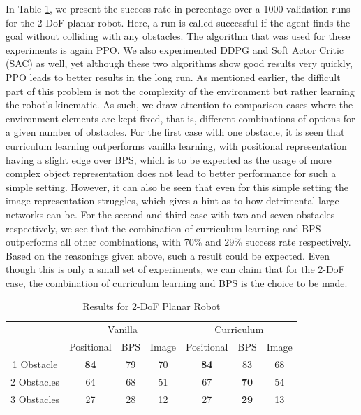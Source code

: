 \documentclass[conference]{IEEEtran}
\begin{document}
In Table \ref{table:1}, we present the success rate in percentage over a 1000 validation runs for the 2-DoF planar robot. Here, a run is called successful if the agent finds the goal without colliding with any obstacles. The algorithm that was used for these experiments is again PPO. We also experimented DDPG and Soft Actor Critic (SAC) as well, yet although these two algorithms show good results very quickly, PPO leads to better results in the long run. As mentioned earlier, the difficult part of this problem is not the complexity of the environment but rather learning the robot's kinematic. As such, we draw attention to comparison cases where the environment elements are kept fixed, that is, different combinations of options for a given number of obstacles. 
For the first case with one obstacle, it is seen that curriculum learning outperforms vanilla learning, with positional representation having a slight edge over BPS, which is to be expected as the usage of more complex object representation does not lead to better performance for such a simple setting. However, it can also be seen that even for this simple setting the image representation struggles, which gives a hint as to how detrimental large networks can be. 
For the second and third case with two and seven obstacles respectively, we see that the combination of curriculum learning and BPS outperforms all other combinations, with 70\% and 29\% success rate respectively. Based on the reasonings given above, such a result could be expected. Even though this is only a small set of experiments, we can claim that for the 2-DoF case, the combination of curriculum learning and BPS is the choice to be made. 

\begin{table}[!t]
	\renewcommand{\arraystretch}{1.3}
	\caption{Results for 2-DoF Planar Robot}
	\label{table:1}
	\centering
	\begin{tabular}{c|ccc|ccc|}
		\cline{2-7}
		& \multicolumn{3}{c|}{Vanilla}                                       & \multicolumn{3}{c|}{Curriculum}                                    \\ \cline{2-7} 
		& \multicolumn{1}{c|}{Positional} & \multicolumn{1}{c|}{BPS} & Image & \multicolumn{1}{c|}{Positional} & \multicolumn{1}{c|}{BPS} & Image \\ \hline
		\multicolumn{1}{|c|}{1 Obstacle}  & \multicolumn{1}{c|}{\textbf{84}}          & \multicolumn{1}{c|}{79}   & 70     & \multicolumn{1}{c|}{\textbf{84}}          & \multicolumn{1}{c|}{83}   & 68     \\ \hline
		\multicolumn{1}{|c|}{2 Obstacles} & \multicolumn{1}{c|}{64}          & \multicolumn{1}{c|}{68}   & 51     & \multicolumn{1}{c|}{67}          & \multicolumn{1}{c|}{\textbf{70}}   & 54     \\ \hline
		\multicolumn{1}{|c|}{3 Obstacles} & \multicolumn{1}{c|}{27}          & \multicolumn{1}{c|}{28}   & 12     & \multicolumn{1}{c|}{27}          & \multicolumn{1}{c|}{\textbf{29}}   & 13     \\ \hline
	\end{tabular}
\end{table}
\end{document}
